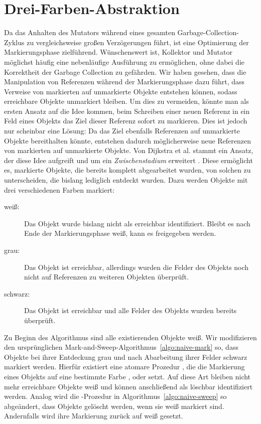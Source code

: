 \section{Drei-Farben-Abstraktion}
\label{sec:tricolor}
Da das Anhalten des Mutators während eines gesamten Garbage-Collection-Zyklus zu vergleichsweise großen Verzögerungen führt, ist eine Optimierung der Markierungsphase zielführend.
Wünschenswert ist, Kollektor und Mutator möglichst häufig eine nebenläufige Ausführung zu ermöglichen, ohne dabei die Korrektheit der Garbage Collection zu gefährden.
Wir haben gesehen, dass die Manipulation von Referenzen während der Markierungsphase dazu führt, dass Verweise von markierten auf unmarkierte Objekte entstehen können, sodass erreichbare Objekte unmarkiert bleiben.
Um dies zu vermeiden, könnte man als ersten Ansatz auf die Idee kommen, beim Schreiben einer neuen Referenz in ein Feld eines Objekts das Ziel dieser Referenz sofort zu markieren.
Dies ist jedoch nur scheinbar eine Lösung:
Da das Ziel ebenfalls Referenzen auf unmarkierte Objekte bereithalten könnte, entstehen dadurch möglicherweise neue Referenzen von markierten auf unmarkierte Objekte.
Von Dijkstra et al. stammt ein Ansatz, der diese Idee aufgreift und um ein \textit{Zwischenstadium} erweitert \cite[S. 969f]{dijkstra1978}.
Diese ermöglicht es, markierte Objekte, die bereits komplett abgearbeitet wurden, von solchen zu unterscheiden, die bislang lediglich entdeckt wurden.
Dazu werden Objekte mit drei verschiedenen Farben markiert:

\begin{description}
	\item[weiß:] Das Objekt wurde bislang nicht als erreichbar identifiziert.
		Bleibt es nach Ende der Markierungsphase weiß, kann es freigegeben werden.
	\item[grau:] Das Objekt ist erreichbar, allerdings wurden die Felder des Objekts noch nicht auf Referenzen zu weiteren Objekten überprüft.
	\item[schwarz:] Das Objekt ist erreichbar und alle Felder des Objekts wurden bereits überprüft.
\end{description}

Zu Beginn des Algorithmus sind alle existierenden Objekte weiß.
Wir modifizieren den ursprünglichen Mark-and-Sweep-Algorithmus~\ref{algo:naive-mark} so, dass Objekte bei ihrer Entdeckung grau und nach Abarbeitung ihrer Felder schwarz markiert werden.
Hierfür existiert eine atomare Prozedur , die die Markierung eines Objekts auf eine bestimmte Farbe ,  oder  setzt.
Auf diese Art bleiben nicht mehr erreichbare Objekte weiß und können anschließend als löschbar identifiziert werden.
Analog wird die -Prozedur in Algorithmus~\ref{algo:naive-sweep} so abgeändert, dass Objekte gelöscht werden, wenn sie weiß markiert sind.
Andernfalls wird ihre Markierung zurück auf weiß gesetzt.

